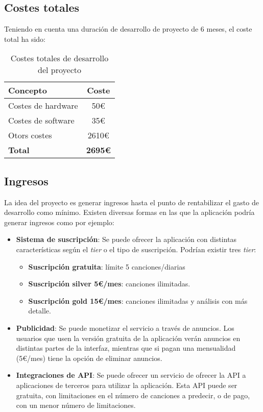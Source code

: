 \subsection{Costes totales}
Teniendo en cuenta una duración de desarrollo de proyecto de 6 meses, el coste total ha sido:

\begin{table}[h]
\centering
\begin{tabular}{|l|c|}
\hline
\textbf{Concepto} & \textbf{Coste} \\
\hline
Costes de hardware & 50€ \\
Costes de software & 35€ \\
Otors costes & 2610€ \\
\hline
\textbf{Total} & \textbf{2695€} \\
\hline
\end{tabular}
\caption{Costes totales de desarrollo del proyecto}
\end{table}

\subsection{Ingresos}
La idea del proyecto es generar ingresos hasta el punto de rentabilizar el gasto de desarrollo como mínimo. 
Existen diversas formas en las que la aplicación podría generar ingresos como por ejemplo:

\begin{itemize}
\tightlist

\item \textbf{Sistema de suscripción}: Se puede ofrecer la aplicación con distintas características según el \textit{tier} o el tipo de suscripción. Podrían existir tres \textit{tier}:
	\begin{itemize}
	\tightlist
	\item \textbf{Suscripción gratuita}: límite 5 canciones/diarias

	\item \textbf{Suscripción silver 5€/mes}: canciones ilimitadas.

	\item \textbf{Suscripción gold 15€/mes}: canciones ilimitadas y análisis con más detalle.
	\end{itemize}

\item \textbf{Publicidad}: Se puede monetizar el servicio a través de anuncios. Los usuarios que usen la versión gratuita de la aplicación verán anuncios en distintas partes de la interfaz, mientras que si pagan una mensualidad (5€/mes) tiene la opción de eliminar anuncios.

\item \textbf{Integraciones de API}: Se puede ofrecer un servicio de ofrecer la API a aplicaciones de terceros para utilizar la aplicación. Esta API puede ser gratuita, con limitaciones en el número de canciones a predecir, o de pago, con un menor número de limitaciones.
\end{itemize}


